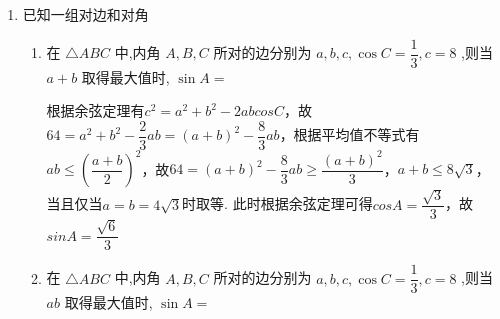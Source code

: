 \begin{enumerate}
\begin{enumerate}
    \item 在 $\triangle A B C$ 中，角 $A, B,C$ 的对边分别是 $a, b, c, A=30^{\circ}, a=3$，若这个三角形有两解，则 $b$ 的取值范围是 .
    \item 已知 $\bigtriangleup  {ABC}$ 的内角 $A,B,C$ 的对边分别为 $a,b,c$ ,且 $b = 6,A = \dfrac{\pi }{3}$ ,若 $\bigtriangleup  {ABC}$ 有两解,则 $a$的取值范围为
    \item 已知 $\bigtriangleup  {ABC}$ 三个内角 $A,B,C$ 的对边分别为 $a,b,c$ ,若满足条件 $A = \dfrac{\pi }{3},b = 2$ 的三角形有两解,则边长 $a$ 的取值范围为
    \item 在 $\triangle A B C$ 中，$A C=8, A=45^{\circ}$ ，要使 $\triangle A B C$ 被唯一确定，那么 $B C$ 的取值范围是 \blkda[3]{$\{4 \sqrt{2}\} \cup[8,+\infty)$}.
    \item 在 $\bigtriangleup  {ABC}$ 中, $A = \dfrac{\pi }{6},{BC} = 2$ ,若满足上述条件的 $\bigtriangleup  {ABC}$ 恰有一解,则边长 ${AC}$ 的取值范围是
    \item 在 $\bigtriangleup  {ABC}$ 中,角 $A$ 、 $B$ 、 $C$ 所对的边分别为 $a$ 、 $b$ 、 $c$ ,已知 $a = 8,B = \dfrac{\pi }{6}$ ,要使该三角形有唯一解,则 $b$ 的取值范围为\blkda[3]{$\{4\} \cup[8,+\infty)$}
\end{enumerate}
\item 已知一组对边和对角
\begin{enumerate}
    \item 在 $\bigtriangleup  {ABC}$ 中,内角 $A,B,C$ 所对的边分别为 $a,b,c,\cos C = \dfrac{1}{3},c = 8$ ,则当 $a + b$ 取得最大值时, $\sin A =$
    \begin{jieda}
        根据余弦定理有$c^2 = a^2+b^2-2abcosC$，故$64 = a^2+b^2-\dfrac{2}{3}ab = (a+b)^2 - \dfrac{8}{3}ab$，根据平均值不等式有$ab \leq \left(\dfrac{a+b}{2}\right)^2$，故$64 = (a+b)^2 - \dfrac{8}{3}ab \geq \dfrac{(a+b)^2}{3}$，$a+b \leq 8\sqrt{3}$，当且仅当$a = b = 4\sqrt{3}$时取等. 此时根据余弦定理可得$cosA = \dfrac{\sqrt{3}}{3}$，故$sinA = \dfrac{\sqrt{6}}{3}$
    \end{jieda}
    \item 在 $\bigtriangleup  {ABC}$ 中,内角 $A,B,C$ 所对的边分别为 $a,b,c,\cos C = \dfrac{1}{3},c = 8$ ,则当 $ab$ 取得最大值时, $\sin A =$\begin{jieda}

\end{jieda}
\end{enumerate}
\end{enumerate}
